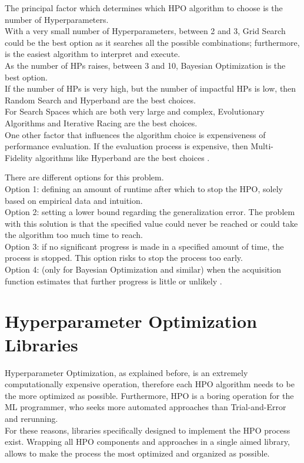 The principal factor which determines which HPO algorithm to choose is the number of Hyperparameters.
\\[0.3cm]With a very small number of Hyperparameters, between 2 and 3, Grid Search could be the best option as it searches all the possible combinations; furthermore, is the easiest algorithm to interpret and execute.
\\[0.3cm]As the number of HPs raises, between 3 and 10, Bayesian Optimization is the best option.
\\[0.3cm]If the number of HPs is very high, but the number of impactful HPs is low, then Random Search and Hyperband are the best choices.
\\[0.3cm]For Search Spaces which are both very large and complex, Evolutionary Algorithms and Iterative Racing are the best choices.
\\[0.3cm]One other factor that influences the algorithm choice is expensiveness of performance evaluation. If the evaluation process is expensive, then Multi-Fidelity algorithms like Hyperband are the best choices \cite{Tesi-1.8}.

There are different options for this problem.
\\[0.3cm]Option 1: defining an amount of runtime after which to stop the HPO, solely based on empirical data and intuition.
\\[0.3cm]Option 2: setting a lower bound regarding the generalization error. The problem with this solution is that the specified value could never be reached or could take the algorithm too much time to reach.
\\[0.3cm]Option 3: if no significant progress is made in a specified amount of time, the process is stopped. This option risks to stop the process too early.
\\[0.3cm]Option 4: (only for Bayesian Optimization and similar) when the acquisition function estimates that further progress is little or unlikely \cite{Tesi-1.8}.

\section{Hyperparameter Optimization Libraries}

Hyperparameter Optimization, as explained before, is an extremely computationally expensive operation, therefore each HPO algorithm needs to be the more optimized as possible.
Furthermore, HPO is a boring operation for the ML programmer, who seeks more automated approaches than Trial-and-Error and rerunning.
\\[0.3cm]For these reasons, libraries specifically designed to implement the HPO process exist.
Wrapping all HPO components and approaches in a single aimed library, allows to make the process the most optimized and organized as possible.

